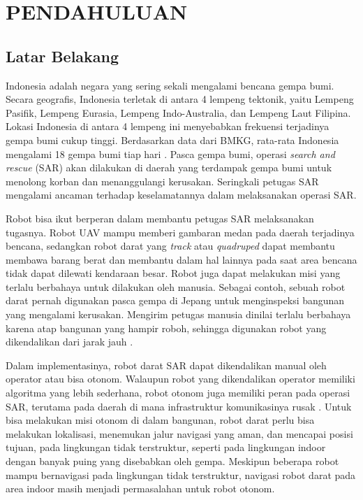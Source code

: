 \chapter{PENDAHULUAN}
\label{chap:pendahuluan}

\section{Latar Belakang}
\label{sec:latarbelakang}

Indonesia adalah negara yang sering sekali mengalami bencana gempa bumi. Secara geografis, Indonesia terletak di antara 4 lempeng tektonik, yaitu Lempeng Pasifik, Lempeng Eurasia, Lempeng Indo-Australia, dan Lempeng Laut Filipina. Lokasi Indonesia di antara 4 lempeng ini menyebabkan frekuensi terjadinya gempa bumi cukup tinggi. Berdasarkan data dari BMKG, rata-rata Indonesia mengalami 18 gempa bumi tiap hari \parencite[]{sabtaji2020statistik}. Pasca gempa bumi, operasi \emph{search and rescue} (SAR) akan dilakukan di daerah yang terdampak gempa bumi untuk menolong korban dan menanggulangi kerusakan. Seringkali petugas SAR mengalami ancaman terhadap keselamatannya dalam melaksanakan operasi SAR. 

Robot bisa ikut berperan dalam membantu petugas SAR melaksanakan tugasnya. Robot UAV mampu memberi gambaran medan pada daerah terjadinya bencana, sedangkan robot darat yang \emph{track} atau \emph{quadruped} dapat membantu membawa barang berat dan membantu dalam hal lainnya pada saat area bencana tidak dapat dilewati kendaraan besar. Robot juga dapat melakukan misi yang terlalu berbahaya untuk dilakukan oleh manusia. Sebagai contoh, sebuah robot darat pernah digunakan pasca gempa di Jepang untuk menginspeksi bangunan yang mengalami kerusakan. Mengirim petugas manusia dinilai terlalu berbahaya karena atap bangunan yang hampir roboh, sehingga digunakan robot yang dikendalikan dari jarak jauh \parencite[]{lin2022integrated}.

Dalam implementasinya, robot darat SAR dapat dikendalikan manual oleh operator atau bisa otonom. Walaupun robot yang dikendalikan operator memiliki algoritma yang lebih sederhana, robot otonom juga memiliki peran pada operasi SAR, terutama pada daerah di mana infrastruktur komunikasinya rusak \parencite[]{zhang2023earthshaker}. Untuk bisa melakukan misi otonom di dalam bangunan, robot darat perlu bisa melakukan lokalisasi, menemukan jalur navigasi yang aman, dan mencapai posisi tujuan, pada lingkungan tidak terstruktur, seperti pada lingkungan indoor dengan banyak puing yang disebabkan oleh gempa. Meskipun beberapa robot mampu bernavigasi pada lingkungan tidak terstruktur, navigasi robot darat pada area indoor masih menjadi permasalahan untuk robot otonom.

